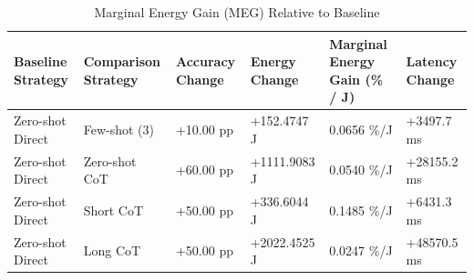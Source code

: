 \begin{table}
\caption{Marginal Energy Gain (MEG) Relative to Baseline}
\label{tab:marginal_energy_gain}
\begin{tabular}{llllll}
\toprule
Baseline Strategy & Comparison Strategy & Accuracy Change & Energy Change & Marginal Energy Gain (\% / J) & Latency Change \\
\midrule
Zero-shot Direct & Few-shot (3) & +10.00 pp & +152.4747 J & 0.0656 \%/J & +3497.7 ms \\
Zero-shot Direct & Zero-shot CoT & +60.00 pp & +1111.9083 J & 0.0540 \%/J & +28155.2 ms \\
Zero-shot Direct & Short CoT & +50.00 pp & +336.6044 J & 0.1485 \%/J & +6431.3 ms \\
Zero-shot Direct & Long CoT & +50.00 pp & +2022.4525 J & 0.0247 \%/J & +48570.5 ms \\
\bottomrule
\end{tabular}
\end{table}
